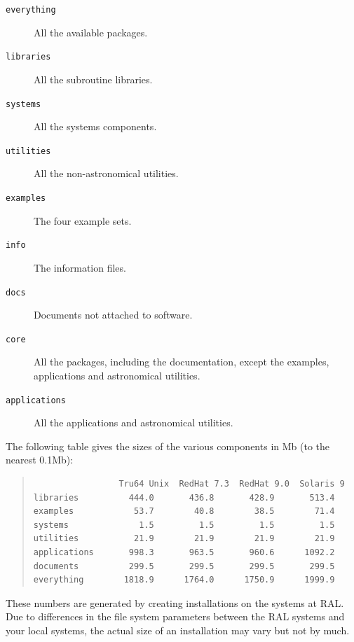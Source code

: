 \documentclass[twoside,11pt]{article}
\renewcommand{\_}{\texttt{\symbol{95}}}
\begin{document}
\begin{description}

\item[\texttt{everything}] All the available packages.

\item[\texttt{libraries}] All the subroutine libraries.

\item[\texttt{systems}] All the systems components.

\item[\texttt{utilities}] All the non-astronomical utilities.

\item[\texttt{examples}] The four example sets.

\item[\texttt{info}] The information files.

\item[\texttt{docs}] Documents not attached to software.

\item[\texttt{core}] All the packages, including the documentation, except
the examples, applications and astronomical utilities.

\item[\texttt{applications}] All the applications and astronomical
utilities.

\end{description}

The following table gives the sizes of the various components in Mb (to
the nearest 0.1Mb):

\begin{quote}
\begin{verbatim}
                 Tru64 Unix  RedHat 7.3  RedHat 9.0  Solaris 9
libraries          444.0       436.8       428.9       513.4
examples            53.7        40.8        38.5        71.4
systems              1.5         1.5         1.5         1.5
utilities           21.9        21.9        21.9        21.9
applications       998.3       963.5       960.6      1092.2
documents          299.5       299.5       299.5       299.5
everything        1818.9      1764.0      1750.9      1999.9
\end{verbatim}
\end{quote}

These numbers are generated by creating installations on the systems at
RAL. Due to differences in the file system parameters between the RAL
systems and your local systems, the actual size of an installation may
vary but not by much.
\end{document}
